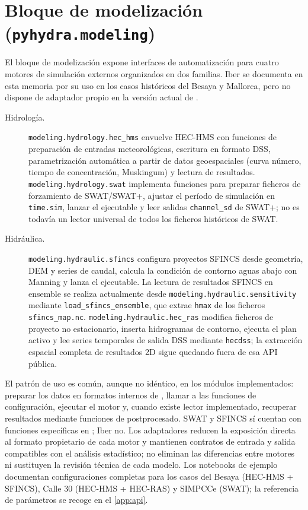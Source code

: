 \section{Bloque de modelización (\texttt{pyhydra.modeling})}

El bloque de modelización expone interfaces de automatización para cuatro motores de simulación externos organizados en dos familias. Iber se documenta en esta memoria por su uso en los casos históricos del Besaya y Mallorca, pero no dispone de adaptador propio en la versión actual de \pyhydra.

\begin{description}
  \item[Hidrología.] \texttt{modeling.hydrology.hec\_hms} envuelve HEC-HMS con funciones de preparación de entradas meteorológicas, escritura en formato DSS, parametrización automática a partir de datos geoespaciales (curva número, tiempo de concentración, Muskingum) y lectura de resultados. \texttt{modeling.hydrology.swat} implementa funciones para preparar ficheros de forzamiento de SWAT/SWAT+, ajustar el período de simulación en \texttt{time.sim}, lanzar el ejecutable y leer salidas \texttt{channel\_sd} de SWAT+; no es todavía un lector universal de todos los ficheros históricos de SWAT.

  \item[Hidráulica.] \texttt{modeling.hydraulic.sfincs} configura proyectos SFINCS desde geometría, DEM y series de caudal, calcula la condición de contorno aguas abajo con Manning y lanza el ejecutable. La lectura de resultados SFINCS en ensemble se realiza actualmente desde \texttt{modeling.hydraulic.sensitivity} mediante \texttt{load\_sfincs\_ensemble}, que extrae \texttt{hmax} de los ficheros \texttt{sfincs\_map.nc}. \texttt{modeling.hydraulic.hec\_ras} modifica ficheros de proyecto no estacionario, inserta hidrogramas de contorno, ejecuta el plan activo y lee series temporales de salida DSS mediante \texttt{hecdss}; la extracción espacial completa de resultados 2D sigue quedando fuera de esa API pública.
\end{description}

El patrón de uso es común, aunque no idéntico, en los módulos implementados: preparar los datos en formatos internos de \pyhydra, llamar a las funciones de configuración, ejecutar el motor y, cuando existe lector implementado, recuperar resultados mediante funciones de postprocesado. SWAT y SFINCS sí cuentan con funciones específicas en \pyhydra; Iber no. Los adaptadores reducen la exposición directa al formato propietario de cada motor y mantienen contratos de entrada y salida compatibles con el análisis estadístico; no eliminan las diferencias entre motores ni sustituyen la revisión técnica de cada modelo. Los notebooks de ejemplo documentan configuraciones completas para los casos del Besaya (HEC-HMS + SFINCS), Calle 30 (HEC-HMS + HEC-RAS) y SIMPCCe (SWAT); la referencia de parámetros se recoge en el \cref{app:api}.

